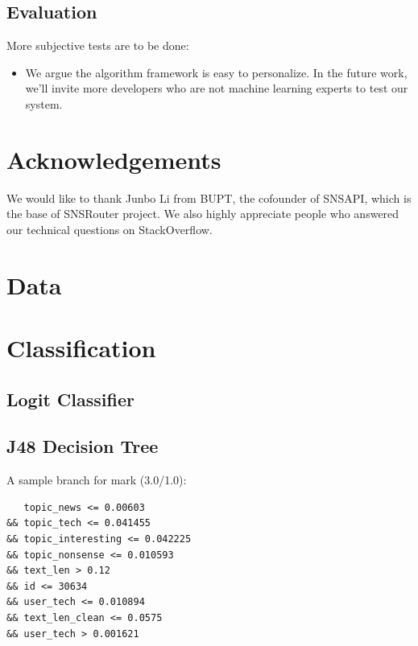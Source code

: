 \documentclass{sig-alternate}
\begin{document}
\subsection{Evaluation}
\label{sec:fu_Evaluation}

More subjective tests are to be done:

\begin{itemize}
	\item We argue the algorithm framework is easy to personalize. 
		In the future work, we'll invite more developers 
		who are not machine learning experts to test our system. 
\end{itemize}

\section*{Acknowledgements}
\label{sec:Acknowledgements}

We would like to thank Junbo Li from BUPT, 
the cofounder of SNSAPI, 
which is the base of SNSRouter project. 
We also highly appreciate people who answered our 
technical questions on StackOverflow. 




\appendix 

\section{Data}
\label{sec:Data}

\section{Classification}
\label{sec:Classification}

\subsection{Logit Classifier}
\label{sec:Logit Classifier}

\subsection{J48 Decision Tree}
\label{sec:J48 Decision Tree}

A sample branch for mark (3.0/1.0):

\begin{Verbatim}
   topic_news <= 0.00603 
&& topic_tech <= 0.041455
&& topic_interesting <= 0.042225 
&& topic_nonsense <= 0.010593 
&& text_len > 0.12 
&& id <= 30634 
&& user_tech <= 0.010894 
&& text_len_clean <= 0.0575
&& user_tech > 0.001621
\end{Verbatim}
\end{document}
